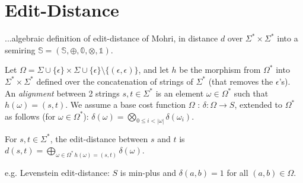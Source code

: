\documentclass[runningheads]{llncs}
\newcommand{\Semiring}{\mathbb{S}}
\newcommand{\zero}{\mathbb{0}}
\newcommand{\one}{\mathbb{1}}
\begin{document}
\section{Edit-Distance}

...algebraic definition of edit-distance of Mohri, in \cite{Mohri03EDWA}
distance $d$ over $\Sigma^* \times \Sigma^*$ 
into a semiring  $\Semiring = ( \Semiring, \oplus, \zero, \otimes, \one)$.

Let $\Omega = \Sigma \cup \{ \epsilon \} \times \Sigma \cup \{ \epsilon \} \setminus \{ (\epsilon, \epsilon) \}$,
and let $h$ be the morphism from $\Omega^*$ into $\Sigma^* \times \Sigma^*$  
defined over the concatenation of strings of $\Sigma^*$ (that removes the $\epsilon$'s).
%
\noindent
An \emph{alignment} between 2 strings  $s, t \in \Sigma^*$ is an element $\omega \in \Omega^*$ 
such that $h(\omega) = (s, t)$.
%
\noindent
We assume a base cost function $\Omega$ : $\delta: \Omega \to S$, extended to $\Omega^*$ as follows  
(for $\omega \in \Omega^*$): 
\(
\displaystyle\delta(\omega) = \bigotimes_{0 \leq i < |\omega|} \delta(\omega_i)
\).

\noindent
\begin{definition}
For  $s, t \in \Sigma^*$, the edit-distance between $s$ and $t$ is  
\( 
d(s, t) = \displaystyle\bigoplus_{\omega \in \Omega^*\, h(\omega) = (s, t)} \delta(\omega)
\).
\end{definition}

e.g. Levenstein edit-distance: $S$ is min-plus and $\delta(a, b) = 1$ for all $(a, b) \in \Omega$.


\end{document}
